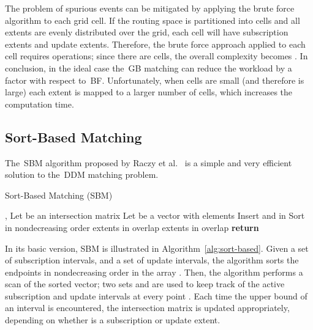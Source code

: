 \documentclass[10pt, conference, compsocconf]{IEEEtran}
\begin{document}
The problem of spurious events can be mitigated by applying the brute
force algorithm to each grid cell. If the routing space is partitioned
into  cells and all extents are evenly distributed over the grid,
each cell will have  subscription extents and  update
extents. Therefore, the brute force approach applied to each cell
requires  operations; since there are  cells, the
overall complexity becomes . In conclusion, in the ideal
case the~\ac{GB} matching can reduce the workload by a factor  with
respect to~\ac{BF}. Unfortunately, when cells are small (and therefore
 is large) each extent is mapped to a larger number of cells, which
increases the computation time.

\subsection{Sort-Based Matching}\label{sec:sort-based}

The~\acl{SBM} algorithm proposed by Raczy et al.~\cite{Raczy2005} is a
simple and very efficient solution to the~\ac{DDM} matching
problem. 

\begin{algorithm}[t]
\caption{Sort-Based Matching (SBM)}\label{alg:sort-based}
\begin{algorithmic}
\State , 
\State Let  be an  intersection matrix
\State Let  be a vector with  elements
\State Insert  and  in 
\EndFor
\State Sort  in nondecreasing order
\State 
{}\label{alg:sbm-loop}
\State 
\Else
\State 
\State\Comment extents in  overlap 
\State 
\ForAll{}
\State 
\State 
\EndFor
\EndIf
\Else{}
\State 
\Else
\State 
\State\Comment extents in  overlap 
\State 
\ForAll{}
\State 
\State 
\EndFor
\EndIf
\EndIf
\EndFor
\State \textbf{return} 
\EndFunction
\end{algorithmic}
\end{algorithm}

In its basic version, \ac{SBM} is illustrated in
Algorithm~\ref{alg:sort-based}. Given a set  of 
subscription intervals, and a set  of  update
intervals, the algorithm sorts the endpoints in nondecreasing order in
the array . Then, the algorithm performs a scan of the sorted
vector; two sets  and 
are used to keep track of the active subscription and update intervals
at every point .  Each time the upper bound of an interval  is
encountered, the intersection matrix  is updated
appropriately, depending on whether  is a subscription or update
extent.
\end{document}

